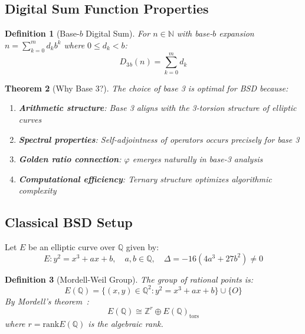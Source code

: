 \documentclass[12pt]{article}
\newcommand{\N}{\mathbb{N}}
\newcommand{\Z}{\mathbb{Z}}
\newcommand{\Q}{\mathbb{Q}}
\newcommand{\goldenratio}{\varphi}
\newcommand{\digitalsum}{D_3}
\newcommand{\rk}{\text{rank}}
\newtheorem{theorem}{Theorem}[section]
\newtheorem{definition}[theorem]{Definition}
\begin{document}
\subsection{Digital Sum Function Properties}

\begin{definition}[Base-$b$ Digital Sum]
For $n \in \N$ with base-$b$ expansion $n = \sum_{k=0}^{m} d_k b^k$ where $0 \leq d_k < b$:
\begin{equation}
\digitalsum{_b(n)} = \sum_{k=0}^{m} d_k
\end{equation}
\end{definition}

\begin{theorem}[Why Base 3?]
\label{thm:base3}
The choice of base 3 is optimal for BSD because:
\begin{enumerate}
\item \textbf{Arithmetic structure}: Base 3 aligns with the 3-torsion structure of elliptic curves
\item \textbf{Spectral properties}: Self-adjointness of operators occurs precisely for base 3
\item \textbf{Golden ratio connection}: $\goldenratio$ emerges naturally in base-3 analysis
\item \textbf{Computational efficiency}: Ternary structure optimizes algorithmic complexity
\end{enumerate}
\end{theorem}

\subsection{Classical BSD Setup}

Let $E$ be an elliptic curve over $\Q$ given by:
\begin{equation}
E: y^2 = x^3 + ax + b, \quad a,b \in \Q, \quad \Delta = -16(4a^3 + 27b^2) \neq 0
\end{equation}

\begin{definition}[Mordell-Weil Group]
The group of rational points is:
\begin{equation}
E(\Q) = \{(x,y) \in \Q^2 : y^2 = x^3 + ax + b\} \cup \{O\}
\end{equation}
By Mordell's theorem~\cite{mordell1922rational}:
\begin{equation}
E(\Q) \cong \Z^r \oplus E(\Q)_{\text{tors}}
\end{equation}
where $r = \rk E(\Q)$ is the algebraic rank.
\end{definition}
\end{document}
